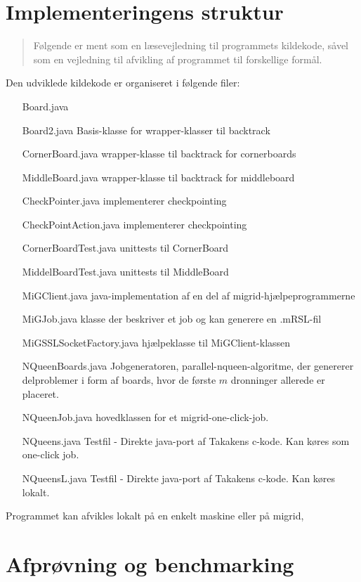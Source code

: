 \documentclass[draft,a4paper,10pt]{article}
\begin{document}
\section{Implementeringens struktur}\label{implementeringensstruktur}
\begin{verse}
	Følgende er ment som en læsevejledning til programmets kildekode, såvel som en vejledning til afvikling af programmet til forskellige formål. 
\end{verse}

Den udviklede kildekode er organiseret i følgende filer:
\begin{itemize}
	\item[Board.java] 
	\item[Board2.java] Basis-klasse for wrapper-klasser til backtrack
	\item[CornerBoard.java] wrapper-klasse til backtrack for cornerboards
	\item[MiddleBoard.java] wrapper-klasse til backtrack for middleboard
	\item[CheckPointer.java] implementerer checkpointing
	\item[CheckPointAction.java] implementerer checkpointing
	\item[CornerBoardTest.java] unittests til CornerBoard
	\item[MiddelBoardTest.java] unittests til MiddleBoard
	\item[MiGClient.java] java-implementation af en del af migrid-hjælpeprogrammerne
	\item[MiGJob.java] klasse der beskriver et job og kan generere en .mRSL-fil
	\item[MiGSSLSocketFactory.java] hjælpeklasse til MiGClient-klassen
	\item[NQueenBoards.java] Jobgeneratoren, parallel-nqueen-algoritme, der genererer delproblemer i form af boards, hvor de første $m$ dronninger allerede er placeret. 
	\item[NQueenJob.java] hovedklassen for et migrid-one-click-job. 
	\item[NQueens.java] Testfil - Direkte java-port af Takakens c-kode. Kan køres som one-click job.
	\item[NQueensL.java] Testfil - Direkte java-port af Takakens c-kode. Kan køres lokalt.
\end{itemize}

Programmet kan afvikles lokalt på en enkelt maskine eller på migrid,  



\section{Afprøvning og benchmarking}
\end{document}
